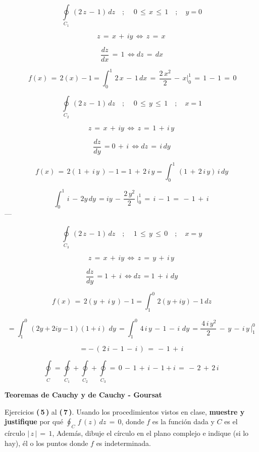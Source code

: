 \documentclass[a4paper,11pt,openany]{book}
\begin{document}
$$\displaystyle\oint\limits_{C_{1}}\,(2\,z\,-\,1)\,dz \quad;\quad \,0\,\leq\,x\,\leq\,1 \quad;\quad y=0 $$

$$ z\,=\,x\,+\,iy\,\iff \,z\,=\,x\, $$

$$ \dfrac{dz}{dx}\,=\,1\, \iff dz\,=\,dx $$

$$ \,f(x)\,=\,2(x)-1 = \displaystyle\int_{0}^{1}\,2\,x\,-\,1\,dx\,=\,\dfrac{2\,x^{2}}{2}\,-\,x \bigg|_{0}^{1}\,=\,1\,-\,1\,=\,0$$

$$\displaystyle\oint\limits_{C_{2}}\,(2\,z\,-\,1)\,dz \quad;\quad \,0\,\leq\,y\,\leq\,1 \quad;\quad x=1 $$

$$ z\,=\,x\,+\,iy\,\iff \,z\,=\,1\,+\,i\,y\, $$

$$ \dfrac{dz}{dy}\,=0\,+\,i\, \iff dz\,=\,i\,dy $$

$$ \,f(x)\,=\,2(\,1\,+\,i\,y\,)-1 = 1\,+\,2\,i\,y = \displaystyle\int_{0}^{1}\,(1\,+\,2\,i\,y)\,i\,dy\,$$

$$ \displaystyle\int_{0}^{1}\,i\,-\,2y\,dy\,=iy\,-\,\dfrac{2\,y^{2}}{2}\, \bigg|_{0}^{1}\,=\,i\,-\,1\,=\,-\,1\,+\,i\,$$
---

$$\displaystyle\oint\limits_{C_{3}}\,(2\,z\,-\,1)\,dz \quad;\quad \,1\,\leq\,y\,\leq\,0 \quad;\quad x=y $$

$$ z\,=\,x\,+\,iy\,\iff \,z\,=\,y\,+\,i\,y\, $$

$$ \dfrac{dz}{dy}\,= 1\,+\,i\, \iff dz\,=1\,+\,i\,\,dy $$

$$ \,f(x)\,=\,2(y\,+\,i\,y\,)-1 = \displaystyle\int_{1}^{0}\,2(y+iy)-1\,dz\,$$

$$ =\displaystyle\int_{1}^{0}\,(2y+2iy-1)(1+i)\,\,dy\,= \displaystyle\int_{1}^{0}\,4\,i\,y\,-\,1\,-\,i\,\,dy\,= \dfrac{\,4\,i\,y^{2}}{2}\,-\,y\,-\,i\,y\, \bigg|_{1}^{0}\,$$

$$ = -\,(\,2\,i\,-\,1\,-\,i\,)\,=\,-\,1\,+\,i\, $$

$$\displaystyle\oint\limits_{C} = \displaystyle\oint\limits_{C_{1}} + \displaystyle\oint\limits_{C_{2}} +\displaystyle\oint\limits_{C_{3}} = \,0\,-\,1\,+\,i\,-\,1+i\, = \boxed{\,-\,2\,+\,2\,i\,} $$


\begin{center}
\textbf{Teoremas de Cauchy y de Cauchy - Goursat}
\end{center}

Ejercicios \textbf{(\,5\,)} al \textbf{(\,7\,)}. Usando los procedimientos vistos en clase, \textbf{muestre y justifique} por qué $\oint_{C}\,f\,(z)\,dz\,=\,0$, donde $f$ es la función dada y $C$ es el círculo $|\,z\,|\,=\,1$, Además, dibuje el círculo en el plano complejo e indique (si lo hay), él o los puntos donde $f$ es indeterminada.\\
\end{document}
